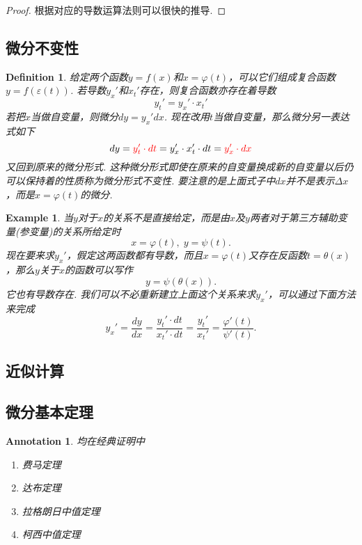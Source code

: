 \documentclass{article}
\newtheorem{example}[theorem]{Example}
\newtheorem{definition}[theorem]{Definition}
\newtheorem{annotation}[theorem]{Annotation}
\begin{document}
\begin{proof}
{\color{blue}根据对应的导数运算法则可以很快的推导}.
\end{proof}

\subsection{微分不变性}

\begin{definition}
\rm 给定两个函数$y = f(x)$和$x = \varphi(t)$，可以它们组成复合函数$y = f(\varepsilon(t))$. 若导数$y_x'$和$x_t'$存在，则复合函数亦存在着导数
$$
y_t' = y_x' \cdot x_t'
$$
若把$x$当做自变量，则微分$dy = y_x'dx$. 现在改用$t$当做自变量，那么微分另一表达式如下
$$
dy = {\color{red}y_t' \cdot dt} = y_x' \cdot x_t' \cdot dt = {\color{red}y_x' \cdot dx}
$$
又回到原来的微分形式. 这种微分形式即使在原来的自变量换成新的自变量以后仍可以保持着的性质称为{\color{red}微分形式不变性}. {\color{blue}要注意的是上面式子中$dx$并不是表示$\Delta x$，而是$x=\varphi(t)$的微分}.
\end{definition}

\begin{example}
\rm 当$y$对于$x$的关系不是直接给定，而是由$x$及$y$两者对于第三方辅助变量(参变量)的关系所给定时
$$
x = \varphi(t), \; y=\psi(t).
$$
现在要来求$y_x'$，假定这两函数都有导数，而且$x=\varphi(t)$又存在反函数$t = \theta(x)$，那么$y$关于$x$的函数可以写作
$$
y = \psi(\theta(x)).
$$
它也有导数存在. 我们可以不必重新建立上面这个关系来求$y_x'$，可以通过下面方法来完成
$$
y_x' = \frac{dy}{dx} = \frac{y_t' \cdot dt}{x_t' \cdot dt} = \frac{y_t'}{x_t'} = \frac{\varphi'(t)
}{\psi'(t)}. 
$$
\end{example}

\subsection{近似计算}


\subsection{微分基本定理}

\begin{annotation}
\rm 均在经典证明中
\begin{enumerate}
	\item 费马定理
	\item 达布定理
	\item 拉格朗日中值定理
	\item 柯西中值定理
\end{enumerate}
\end{annotation}
\end{document}
